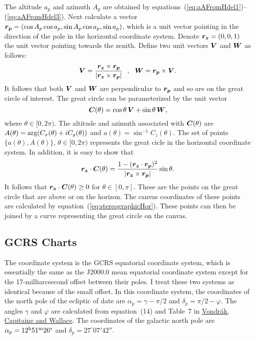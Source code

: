 \documentclass[12pt]{article}
\newcommand \beq {\begin{equation}}
\newcommand \eeq {\end{equation}}
\newcommand{\ve}[1]{\mbox{\boldmath $#1$}}
\begin{document}
The altitude $a_p$ and azimuth $A_p$ are obtained by 
equations~(\ref{eq:aAFromHdel1})--(\ref{eq:aAFromHdel3}). Next calculate a vector 
$\ve{r_p} = (\cos A_p \cos a_p, \sin A_p \cos a_p, \sin a_p)$, which is a unit 
vector pointing in the direction of the pole in the horizontal coordinate system.
Denote $\ve{r_z}=(0,0,1)$ the unit vector pointing towards the zenith. Define two 
unit vectors $\ve{V}$ and $\ve{W}$ as follows:
\beq
  \ve{V} = \frac{\ve{r_z}\times \ve{r_p}}{|\ve{r_z}\times \ve{r_p}|} \ \ , \ \ 
  \ve{W} = \ve{r_p} \times \ve{V} .
\eeq
It follows that both $\ve{V}$ and $\ve{W}$ are perpendicular to $\ve{r_p}$ and so 
are on the great circle of interest. The great circle can be parameterized by 
the unit vector
\beq
  \ve{C}(\theta) = \cos \theta \, \ve{V} + \sin \theta \, \ve{W} ,
\eeq
where $\theta \in [0,2\pi)$. The altitude and azimuth associated with 
$\ve{C}(\theta)$ are $A(\theta)={\rm arg}(C_x(\theta) + i C_y(\theta))$ and 
$a(\theta) = \sin^{-1} C_z(\theta)$. The set of points $\{ a(\theta), A(\theta) \}$, 
$\theta \in [0,2\pi)$ represents the great cicle in the horizontal coordinate 
system. In addition, it is easy to show that 
\beq
  \ve{r_z} \cdot \ve{C}(\theta) = \frac{1-(\ve{r_z}\cdot \ve{r_p})^2}
{|\ve{r_z}\times \ve{r_p}|} 
\sin \theta .
\eeq
It follows that $\ve{r_z} \cdot \ve{C}(\theta) \geq 0$ for $\theta \in [0,\pi]$. 
These are the points on the great circle that are above or on the horizon. 
The canvas coordinates of these points are calculated by 
equation~(\ref{eq:stereographicHor}). These points can then be joined by a 
curve representing the great circle on the canvas.

\subsection{GCRS Charts} 

The coordinate system is the GCRS equatorial coordinate system, which is essentially 
the same as the J2000.0 mean equatorial coordinate system except for the 
17-milliarcsecond offset between their poles. I treat these two systems 
as identical because of the small offset. In this coordinate system, the 
coordinates of the north pole of the ecliptic of date are $\alpha_p = \gamma-\pi/2$ 
and $\delta_p = \pi/2 - \varphi$. The angles $\gamma$ and $\varphi$ are 
calculated from equation~(14) and Table~7 in
\href{https://ui.adsabs.harvard.edu/abs/2011A%26A...534A..22V/abstract}{Vondr\'ak,
Capitaine and Wallace}. The coordinates of the galactic north pole are 
$\alpha_{p} = 12^{\rm h} 51^{\rm m} 26^{\rm s}$ and $\delta_{p} = 27^\circ 07' 42''$. 
\end{document}
